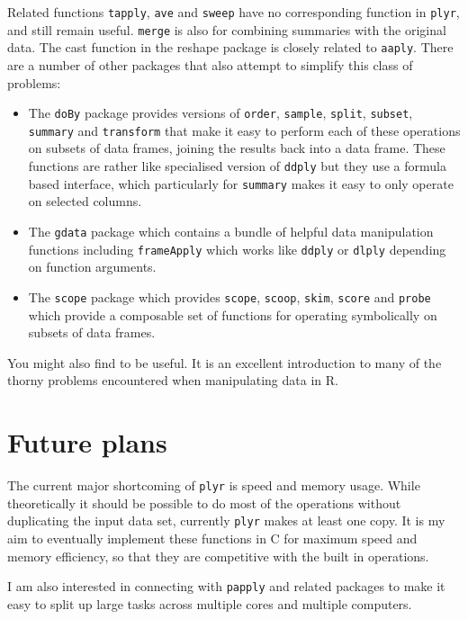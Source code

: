 \documentclass{scrartcl}
\newcommand{\code}[1]{\lstinline!#1!}
\newcommand{\plyr}{{\tt plyr}\xspace}
\begin{document}
Related functions {\tt tapply}, {\tt ave} and {\tt sweep} have no corresponding function in {\tt plyr}, and still remain useful. {\tt merge} is also for combining summaries with the original data.  The cast function in the reshape package \citep{reshape} is closely related to {\tt aaply}.  There are a number of other packages that also attempt to simplify this class of problems:

\begin{itemize}
  \item The {\tt doBy} \citep{doby} package provides versions of \code{order}, \code{sample}, \code{split}, \code{subset}, \code{summary} and \code{transform} that make it easy to perform each of these operations on subsets of data frames, joining the results back into a data frame.  These functions are rather like specialised version of \code{ddply} but they use a formula based interface, which particularly for \code{summary} makes it easy to only operate on selected columns. 
  
  \item The {\tt gdata} \citep{gdata} package which contains a bundle of helpful data manipulation functions including \code{frameApply} which works like \code{ddply} or \code{dlply} depending on function arguments.

  \item The {\tt scope} \citep{scope} package which provides \code{scope}, \code{scoop}, \code{skim}, \code{score} and \code{probe} which provide a composable set of functions for operating symbolically on subsets of data frames.
  
\end{itemize}

You might also find \citet{spector:2008} to be useful.  It is an excellent introduction to many of the thorny problems encountered when manipulating data in R.

\section{Future plans}
\label{sec:future}

The current major shortcoming of \plyr is speed and memory usage.  While theoretically it should be possible to do most of the operations without duplicating the input data set, currently \plyr makes at least one copy.  It is my aim to eventually implement these functions in C for maximum speed and memory efficiency, so that they are competitive with the built in operations.  

I am also interested in connecting with {\tt papply} \citep{papply} and related packages to make it easy to split up large tasks across multiple cores and multiple computers.


\end{document}
